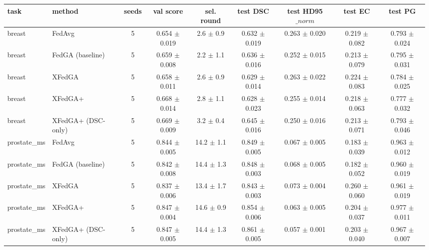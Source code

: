 \begin{tabular}{llccccccc}
\hline
task & method & seeds & val score & sel. round & test DSC & test HD95$\_{norm}$ & test EC & test PG \\
\hline
breast & FedAvg & 5 & 0.654 $\pm$ 0.019 & 2.6 $\pm$ 0.9 & 0.632 $\pm$ 0.019 & 0.263 $\pm$ 0.020 & 0.219 $\pm$ 0.082 & 0.793 $\pm$ 0.024 \\
breast & FedGA (baseline) & 5 & 0.659 $\pm$ 0.008 & 2.2 $\pm$ 1.1 & 0.636 $\pm$ 0.016 & 0.252 $\pm$ 0.015 & 0.213 $\pm$ 0.079 & 0.795 $\pm$ 0.031 \\
breast & XFedGA & 5 & 0.658 $\pm$ 0.011 & 2.6 $\pm$ 0.9 & 0.629 $\pm$ 0.014 & 0.263 $\pm$ 0.022 & 0.224 $\pm$ 0.083 & 0.784 $\pm$ 0.025 \\
breast & XFedGA+ & 5 & 0.668 $\pm$ 0.014 & 2.8 $\pm$ 1.1 & 0.628 $\pm$ 0.023 & 0.255 $\pm$ 0.014 & 0.218 $\pm$ 0.063 & 0.777 $\pm$ 0.032 \\
breast & XFedGA+ (DSC-only) & 5 & 0.669 $\pm$ 0.009 & 3.2 $\pm$ 0.4 & 0.645 $\pm$ 0.016 & 0.250 $\pm$ 0.016 & 0.213 $\pm$ 0.071 & 0.793 $\pm$ 0.046 \\
prostate\_ms & FedAvg & 5 & 0.844 $\pm$ 0.005 & 14.2 $\pm$ 1.1 & 0.849 $\pm$ 0.005 & 0.067 $\pm$ 0.005 & 0.183 $\pm$ 0.039 & 0.963 $\pm$ 0.012 \\
prostate\_ms & FedGA (baseline) & 5 & 0.842 $\pm$ 0.008 & 14.4 $\pm$ 1.3 & 0.848 $\pm$ 0.003 & 0.068 $\pm$ 0.005 & 0.182 $\pm$ 0.052 & 0.960 $\pm$ 0.019 \\
prostate\_ms & XFedGA & 5 & 0.837 $\pm$ 0.006 & 13.4 $\pm$ 1.7 & 0.843 $\pm$ 0.003 & 0.073 $\pm$ 0.004 & 0.260 $\pm$ 0.060 & 0.961 $\pm$ 0.019 \\
prostate\_ms & XFedGA+ & 5 & 0.847 $\pm$ 0.004 & 14.6 $\pm$ 0.9 & 0.854 $\pm$ 0.006 & 0.063 $\pm$ 0.005 & 0.204 $\pm$ 0.037 & 0.977 $\pm$ 0.011 \\
prostate\_ms & XFedGA+ (DSC-only) & 5 & 0.847 $\pm$ 0.005 & 14.4 $\pm$ 1.3 & 0.861 $\pm$ 0.005 & 0.057 $\pm$ 0.001 & 0.203 $\pm$ 0.040 & 0.967 $\pm$ 0.007 \\
\hline
\end{tabular}
